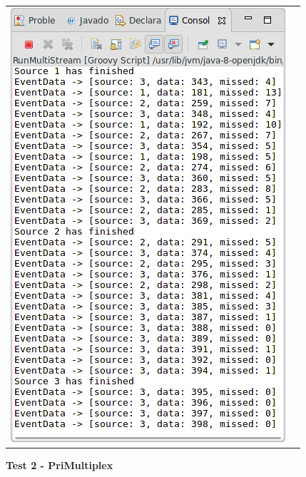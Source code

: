 \begin{tabular}{c|c}
	\includegraphics[width=\textwidth/2]{img/screenshots/9-3-1-2.png} \\

\end{tabular}

\textbf{Test 2 - PriMultiplex}

